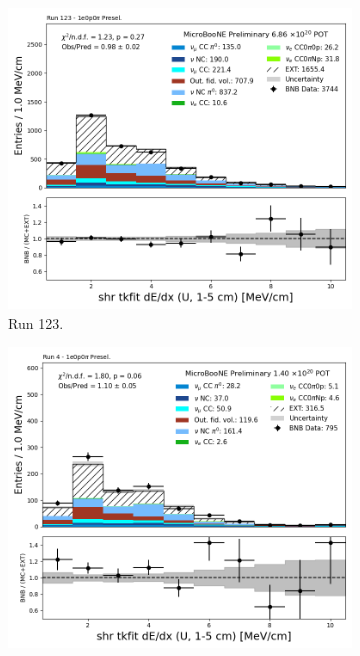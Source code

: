 \begin{figure}[H]
    \centering
    \begin{subfigure}[t]{0.32\linewidth}
        \includegraphics[width=\linewidth]{technote/Appendix_Preselection/Figures/1e0p0pi/Run123/shr_tkfit_gap10_dedx_U_Run123_1e0p0pi_Presel.png}
        \caption{Run 123.}
    \end{subfigure}%
    \hspace{0.2cm}%
    \begin{subfigure}[t]{0.32\linewidth}
        \includegraphics[width=\linewidth]{technote/Appendix_Preselection/Figures/1e0p0pi/Run4b/shr_tkfit_gap10_dedx_U_Run4b_1e0p0pi_Presel.png}

\end{subfigure}
\end{figure}
